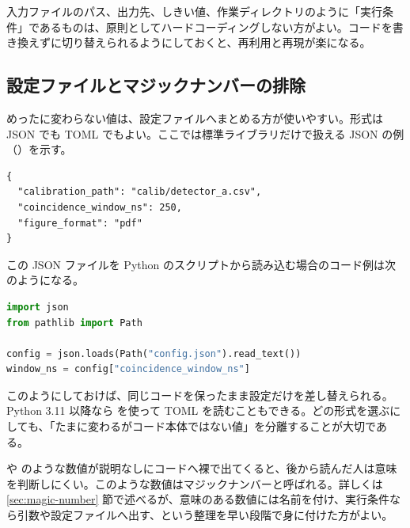 入力ファイルのパス、出力先、しきい値、作業ディレクトリのように「実行条件」であるものは、原則としてハードコーディングしない方がよい。コードを書き換えずに切り替えられるようにしておくと、再利用と再現が楽になる。

\subsection{設定ファイルとマジックナンバーの排除}

めったに変わらない値は、設定ファイルへまとめる方が使いやすい。形式は JSON でも TOML でもよい。ここでは標準ライブラリだけで扱える JSON の例（）を示す。

\begin{lstlisting}[numbers=none, xleftmargin=2\zw, title={config.json}]
{
  "calibration_path": "calib/detector_a.csv",
  "coincidence_window_ns": 250,
  "figure_format": "pdf"
}
\end{lstlisting}

この JSON ファイルを Python のスクリプトから読み込む場合のコード例は次のようになる。

\begin{lstlisting}[language=Python]
import json
from pathlib import Path

config = json.loads(Path("config.json").read_text())
window_ns = config["coincidence_window_ns"]
\end{lstlisting}

このようにしておけば、同じコードを保ったまま設定だけを差し替えられる。Python 3.11 以降なら  を使って TOML を読むこともできる。どの形式を選ぶにしても、「たまに変わるがコード本体ではない値」を分離することが大切である。



 や  のような数値が説明なしにコードへ裸で出てくると、後から読んだ人は意味を判断しにくい。このような数値はマジックナンバーと呼ばれる。詳しくは \ref{sec:magic-number} 節で述べるが、意味のある数値には名前を付け、実行条件なら引数や設定ファイルへ出す、という整理を早い段階で身に付けた方がよい。
